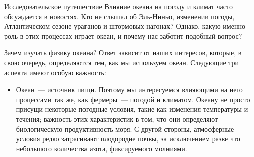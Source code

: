 
\begin{chapter}{Исследовательское путешествие}
Влияние океана на погоду и климат часто обсуждается в новостях. Кто не слышал 
об Эль-Ниньо, изменении погоды, Атлантическом сезоне ураганов и штормовых 
нагонах? Однако, какую именно роль в этих процессах играет океан, и почему 
нас заботит подобный вопрос?
%

\begin{section}{Зачем изучать физику океана?}
Ответ зависит от наших интересов, которые, в свою очередь, определяются тем,
как мы используем океан. Следующие три аспекта имеют особую важность:
%

\begin{itemize}
\item 
Океан~--- источник пищи. Поэтому мы интересуемся влияющими на него процессами 
так же, как фермеры~--- погодой и климатом. Океану не просто присущи 
некоторые погодные условия, такие как изменения температуры и течения; 
важность этих характеристик в том, что они определяют биологическую 
продуктивность моря. С другой стороны, атмосферные условия редко затрагивают 
плодородие почвы, за исключением разве что небольшого количества азота, 
фиксируемого молниями.
%


\end{itemize}
\end{section}
\end{chapter}

